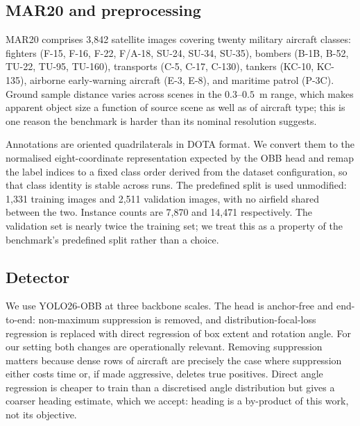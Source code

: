 \documentclass[conference]{IEEEtran}
\begin{document}
\subsection{MAR20 and preprocessing}
MAR20 comprises 3{,}842 satellite images covering twenty military aircraft
classes: fighters (F-15, F-16, F-22, F/A-18, SU-24, SU-34, SU-35), bombers (B-1B,
B-52, TU-22, TU-95, TU-160), transports (C-5, C-17, C-130), tankers (KC-10,
KC-135), airborne early-warning aircraft (E-3, E-8), and maritime patrol (P-3C).
Ground sample distance varies across scenes in the $0.3$--$0.5$~m range, which
makes apparent object size a function of source scene as well as of aircraft
type; this is one reason the benchmark is harder than its nominal resolution
suggests.

Annotations are oriented quadrilaterals in DOTA format. We convert them to the
normalised eight-coordinate representation expected by the OBB head and remap the
label indices to a fixed class order derived from the dataset configuration, so
that class identity is stable across runs. The predefined split is used
unmodified: 1{,}331 training images and 2{,}511 validation images, with no
airfield shared between the two. Instance counts are 7{,}870 and 14{,}471
respectively. The validation set is nearly twice the training set; we treat this
as a property of the benchmark's predefined split rather than a choice.

\subsection{Detector}
We use YOLO26-OBB \cite{ultralytics} at three backbone scales. The head is
anchor-free and end-to-end: non-maximum suppression is removed, and
distribution-focal-loss regression is replaced with direct regression of box
extent and rotation angle.
For our setting both changes are operationally relevant. Removing suppression
matters because dense rows of aircraft are precisely the case where suppression
either costs time or, if made aggressive, deletes true positives. Direct angle
regression is cheaper to train than a discretised angle distribution but gives a
coarser heading estimate, which we accept: heading is a by-product of this work,
not its objective.
\end{document}
